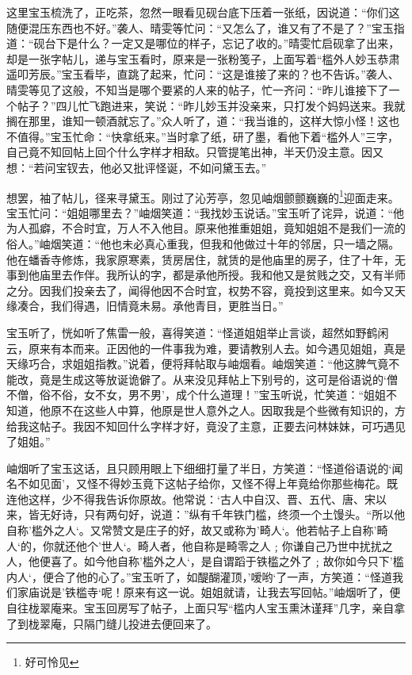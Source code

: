 \documentclass[12pt,oneside]{book}
\begin{document}
这里宝玉梳洗了，正吃茶，忽然一眼看见砚台底下压着一张纸，因说道：“你们这随便混压东西也不好。”袭人、晴雯等忙问：“又怎么了，谁又有了不是了？”宝玉指道：“砚台下是什么？一定又是哪位的样子，忘记了收的。”晴雯忙启砚拿了出来，却是一张字帖儿，递与宝玉看时，原来是一张粉笺子，上面写着“槛外人妙玉恭肃遥叩芳辰。”宝玉看毕，直跳了起来，忙问：“这是谁接了来的？也不告诉。”袭人、晴雯等见了这般，不知当是哪个要紧的人来的帖子，忙一齐问：“昨儿谁接下了一个帖子？”四儿忙飞跑进来，笑说：“昨儿妙玉并没亲来，只打发个妈妈送来。我就搁在那里，谁知一顿酒就忘了。”众人听了，道：“我当谁的，这样大惊小怪！这也不值得。”宝玉忙命：“快拿纸来。”当时拿了纸，研了墨，看他下着“槛外人”三字，自己竟不知回帖上回个什么字样才相敌。只管提笔出神，半天仍没主意。因又想：“若问宝钗去，他必又批评怪诞，不如问黛玉去。”

想罢，袖了帖儿，径来寻黛玉。刚过了沁芳亭，忽见岫烟颤颤巍巍的\footnote{好可怜见}迎面走来。宝玉忙问：“姐姐哪里去？”岫烟笑道：“我找妙玉说话。”宝玉听了诧异，说道：“他为人孤癖，不合时宜，万人不入他目。原来他推重姐姐，竟知姐姐不是我们一流的俗人。”岫烟笑道：“他也未必真心重我，但我和他做过十年的邻居，只一墙之隔。他在蟠香寺修炼，我家原寒素，赁房居住，就赁的是他庙里的房子，住了十年，无事到他庙里去作伴。我所认的字，都是承他所授。我和他又是贫贱之交，又有半师之分。因我们投亲去了，闻得他因不合时宜，权势不容，竟投到这里来。如今又天缘凑合，我们得遇，旧情竟未易。承他青目，更胜当日。”

宝玉听了，恍如听了焦雷一般，喜得笑道：“怪道姐姐举止言谈，超然如野鹤闲云，原来有本而来。正因他的一件事我为难，要请教别人去。如今遇见姐姐，真是天缘巧合，求姐姐指教。”说着，便将拜帖取与岫烟看。岫烟笑道：“他这脾气竟不能改，竟是生成这等放诞诡僻了。从来没见拜帖上下别号的，这可是俗语说的‘僧不僧，俗不俗，女不女，男不男’，成个什么道理！”宝玉听说，忙笑道：“姐姐不知道，他原不在这些人中算，他原是世人意外之人。因取我是个些微有知识的，方给我这帖子。我因不知回什么字样才好，竟没了主意，正要去问林妹妹，可巧遇见了姐姐。”

岫烟听了宝玉这话，且只顾用眼上下细细打量了半日，方笑道：“怪道俗语说的‘闻名不如见面’，又怪不得妙玉竟下这帖子给你，又怪不得上年竟给你那些梅花。既连他这样，少不得我告诉你原故。他常说：‘古人中自汉、晋、五代、唐、宋以来，皆无好诗，只有两句好，说道：”纵有千年铁门槛，终须一个土馒头。“所以他自称’槛外之人‘。又常赞文是庄子的好，故又或称为’畸人‘。他若帖子上自称’畸人‘的，你就还他个’世人‘。畸人者，他自称是畸零之人﹔你谦自己乃世中扰扰之人，他便喜了。如今他自称’槛外之人‘，是自谓蹈于铁槛之外了﹔故你如今只下’槛内人‘，便合了他的心了。”宝玉听了，如醍醐灌顶，’嗳哟‘了一声，方笑道：“怪道我们家庙说是’铁槛寺‘呢！原来有这一说。姐姐就请，让我去写回帖。”岫烟听了，便自往栊翠庵来。宝玉回房写了帖子，上面只写“槛内人宝玉熏沐谨拜”几字，亲自拿了到栊翠庵，只隔门缝儿投进去便回来了。
\end{document}
